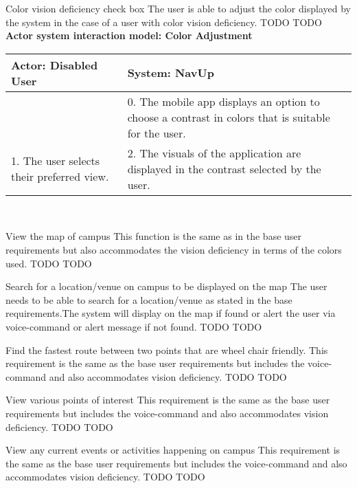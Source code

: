 \FuncReq
{Color vision deficiency check box}
{The user is able to adjust the color displayed by the system in the case of a user with color vision deficiency.}
{TODO}
{TODO}
    \\
    \textbf{Actor system interaction model: Color Adjustment}\\
    \begin{tabular}{ | p{6cm} | p{6cm} |}
    \hline
    Actor: Disabled User & System: NavUp \\ \hline
     & 0. The mobile app displays an option to choose a contrast in colors that is suitable for the user.\\ \hline
    1. The user selects their preferred view. & 2. The visuals of the application are displayed in the contrast selected by the user.\\ \hline   
    \end{tabular}
\\
\bigskip

\FuncReq
{View the map of campus}
{This function is the same as in the base user requirements but also accommodates the vision deficiency in terms of the colors used.}
{TODO}
{TODO}

\FuncReq
{Search for a location/venue on campus to be displayed on the map}
{The user needs to be able to search for a location/venue as stated in the base requirements.The system will display on the map if found or alert the user via voice-command or alert message if not found.}
{TODO}
{TODO}

\FuncReq
{Find the fastest route between two points that are wheel chair friendly.}%
{ This requirement is the same as the base user requirements but includes the voice-command and also accommodates vision deficiency.}
{TODO}
{TODO}

\FuncReq
{View various points of interest}
{This requirement is the same as the base user requirements but includes the voice-command and also accommodates vision deficiency.}
{TODO}
{TODO}

\FuncReq
{View any current events or activities happening on campus}
{This requirement is the same as the base user requirements but includes the voice-command and also accommodates vision deficiency.}
{TODO}
{TODO}

